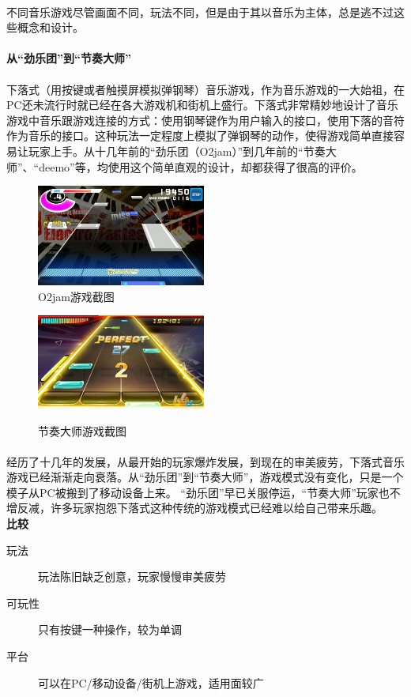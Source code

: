 \documentclass{article} \usepackage{CJK}
\begin{document}
\paragraph{}
不同音乐游戏尽管画面不同，玩法不同，但是由于其以音乐为主体，总是逃不过这些概念和设计。
\paragraph{从“劲乐团”到“节奏大师”}
\paragraph{}
下落式（用按键或者触摸屏模拟弹钢琴）音乐游戏，作为音乐游戏的一大始祖，在PC还未流行时就已经在各大游戏机和街机上盛行。下落式非常精妙地设计了音乐游戏中音乐跟游戏连接的方式：使用钢琴键作为用户输入的接口，使用下落的音符作为音乐的接口。这种玩法一定程度上模拟了弹钢琴的动作，使得游戏简单直接容易让玩家上手。从十几年前的“劲乐团（O2jam）”到几年前的“节奏大师”、“deemo”等，均使用这个简单直观的设计，却都获得了很高的评价。
\begin{figure}[H]
\begin{minipage}{0.5\linewidth}
  \includegraphics[width=15em]{O2jam.png}\\
  \caption{O2jam游戏截图}\label{3-1}
\end{minipage}
\begin{minipage}{0.5\linewidth}
  \includegraphics[width=15em]{rm.png}\\
  \caption{节奏大师游戏截图}\label{3-2}
\end{minipage}
\end{figure}
\paragraph{}
经历了十几年的发展，从最开始的玩家爆炸发展，到现在的审美疲劳，下落式音乐游戏已经渐渐走向衰落。从“劲乐团”到“节奏大师”，游戏模式没有变化，只是一个模子从PC被搬到了移动设备上来。
“劲乐团”早已关服停运，“节奏大师”玩家也不增反减，许多玩家抱怨下落式这种传统的游戏模式已经难以给自己带来乐趣。\\
\textbf{比较}
\begin{description}
  \item[玩法] 玩法陈旧缺乏创意，玩家慢慢审美疲劳
  \item[可玩性] 只有按键一种操作，较为单调
  \item[平台] 可以在PC/移动设备/街机上游戏，适用面较广
\end{description}
\end{document}
